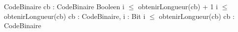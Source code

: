 \begin{algorithme}
        {}{CodeBinaire}{}
        {cb : CodeBinaire}
        {Booleen}{}
        {
        }
        {i $\leq$ obtenirLongueur(cb) + 1}
        {
        }
        {i $\leq$ obtenirLongueur(cb)}
        {cb : CodeBinaire, i : \naturelNonNul}
        {Bit}
        {i $\leq$ obtenirLongueur(cb)}
        {cb : CodeBinaire}
        {\naturel}{}
\end{algorithme}